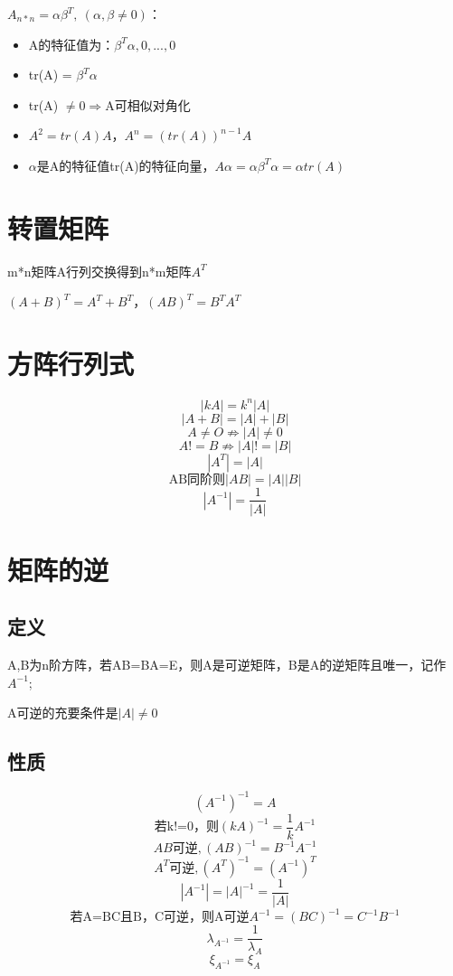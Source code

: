 \(A_{n * n} = \alpha\beta^T,\ (\alpha, \beta \neq 0)\)：\begin{itemize}
    \item A的特征值为：\(\beta^T\alpha, 0, ..., 0\)
    \item tr(A) = \(\beta^T\alpha\)
    \item tr(A) \(\neq 0 \Rightarrow\)A可相似对角化
    \item \(A^2 = tr(A)A\)，\(A^n = (tr(A))^{n - 1}A\)
    \item \(\alpha\)是A的特征值tr(A)的特征向量，\(A\alpha = \alpha\beta^T\alpha = \alpha tr(A)\)
\end{itemize}



\section{转置矩阵}

m*n矩阵A行列交换得到n*m矩阵\(A^T\)

\((A + B)^T = A^T + B^T\)，\((AB)^T = B^TA^T\)


\section{方阵行列式}

\[|kA| = k^n|A|\]
\[|A + B| = |A| + |B|\]
\[A \neq O \nRightarrow |A| \neq 0\]
\[A != B \nRightarrow |A| != |B|\]
\[|A^T| = |A|\]
\[\text{AB同阶则}|AB| = |A||B|\]
\[|A^{-1}| = \dfrac{1}{|A|}\]
\mymatrix


\section{矩阵的逆}

\subsection{定义}
A,B为n阶方阵，若AB=BA=E，则A是可逆矩阵，B是A的逆矩阵且唯一，记作\(A^{-1}\);

A可逆的充要条件是\(|A|\neq 0\)
\mymatrix


\subsection{性质}
\[(A^{-1})^{-1} = A\]
\[\text{若k!=0，则}(kA)^{-1} = \frac{1}{k}A^{-1}\]
\[AB\text{可逆},(AB)^{-1} = B^{-1}A^{-1}\]
\[A^T\text{可逆},(A^T)^{-1} = (A^{-1})^T\]
\[|A^{-1}| = |A|^{-1} = \frac{1}{|A|}\]
\[\text{若A=BC且B，C可逆，则A可逆}A^{-1} = (BC)^{-1} = C^{-1}B^{-1}\]
\[\lambda_{A^{-1}} = \dfrac{1}{\lambda_A}\]
\[\xi_{A^{-1}} = \xi_A\]



